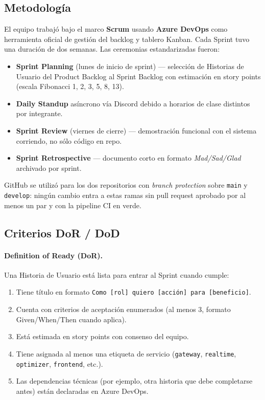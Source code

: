 \documentclass[12pt,a4paper,oneside]{article}
\begin{document}
\subsection{Metodolog\'ia}
El equipo trabaj\'o bajo el marco \textbf{Scrum} usando \textbf{Azure DevOps} como herramienta oficial de gesti\'on del backlog y tablero Kanban. Cada Sprint tuvo una duraci\'on de dos semanas. Las ceremonias estandarizadas fueron:

\begin{itemize}[leftmargin=*]
  \item \textbf{Sprint Planning} (lunes de inicio de sprint) --- selecci\'on de Historias de Usuario del Product Backlog al Sprint Backlog con estimaci\'on en story points (escala Fibonacci 1, 2, 3, 5, 8, 13).
  \item \textbf{Daily Standup} as\'incrono v\'ia Discord debido a horarios de clase distintos por integrante.
  \item \textbf{Sprint Review} (viernes de cierre) --- demostraci\'on funcional con el sistema corriendo, no s\'olo c\'odigo en repo.
  \item \textbf{Sprint Retrospective} --- documento corto en formato \emph{Mad/Sad/Glad} archivado por sprint.
\end{itemize}

GitHub se utiliz\'o para los dos repositorios con \emph{branch protection} sobre \texttt{main} y \texttt{develop}: ning\'un cambio entra a estas ramas sin pull request aprobado por al menos un par y con la pipeline CI en verde.

\subsection{Criterios DoR / DoD}

\paragraph{Definition of Ready (DoR).} Una Historia de Usuario est\'a lista para entrar al Sprint cuando cumple:
\begin{enumerate}[leftmargin=*]
  \item Tiene t\'itulo en formato \texttt{Como [rol] quiero [acci\'on] para [beneficio]}.
  \item Cuenta con criterios de aceptaci\'on enumerados (al menos 3, formato Given/When/Then cuando aplica).
  \item Est\'a estimada en story points con consenso del equipo.
  \item Tiene asignada al menos una etiqueta de servicio (\texttt{gateway}, \texttt{realtime}, \texttt{optimizer}, \texttt{frontend}, etc.).
  \item Las dependencias t\'ecnicas (por ejemplo, otra historia que debe completarse antes) est\'an declaradas en Azure DevOps.
\end{enumerate}
\end{document}
